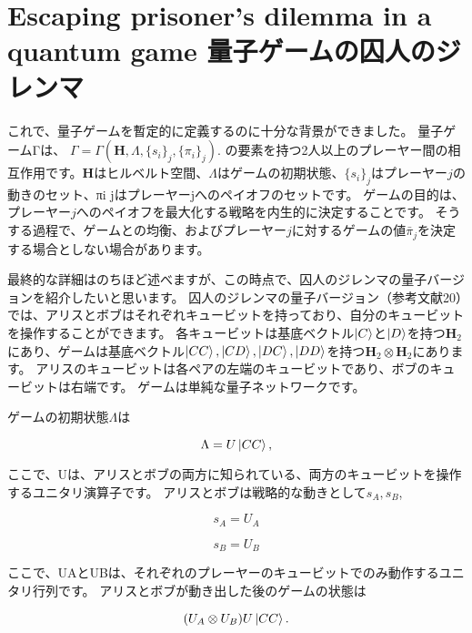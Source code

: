 \section{Escaping prisoner’s dilemma in a quantum game 量子ゲームの囚人のジレンマ}

これで、量子ゲームを暫定的に定義するのに十分な背景ができました。 量子ゲームΓは、
$\Gamma = \Gamma ( \mathbf{H}, \Lambda,\{ s_i \}_j, \{  \pi_i \}_j ).$
の要素を持つ2人以上のプレーヤー間の相互作用です。$\mathbf{H}$はヒルベルト空間、$\Lambda$はゲームの初期状態、$ \{s_i\}_ j$はプレーヤー$j$の動きのセット、{πi} jはプレーヤーjへのペイオフのセットです。
ゲームの目的は、プレーヤー$j$へのペイオフを最大化する戦略を内生的に決定することです。
  そうする過程で、ゲームとの均衡、およびプレーヤー$j$に対するゲームの値$\bar{\pi}_j$を決定する場合としない場合があります。

最終的な詳細はのちほど述べますが、この時点で、囚人のジレンマの量子バージョンを紹介したいと思います。
  囚人のジレンマの量子バージョン（参考文献20）では、アリスとボブはそれぞれキュービットを持っており、自分のキュービットを操作することができます。
各キュービットは基底ベクトル$\ket{C}$と$\ket{D}$を持つ$\mathbf{H}_2$にあり、ゲームは基底ベクトル$\ket{CC}, \ket{CD}, \ket{DC}, \ket{DD}$を持つ$\mathbf{H}_2 \otimes \mathbf{H}_2 $にあります。
  アリスのキュービットは各ペアの左端のキュービットであり、ボブのキュービットは右端です。 ゲームは単純な量子ネットワークです。
 
 ゲームの初期状態$\Lambda$は
 
\begin{equation}
\label{119}
\Lambda = U \ket{CC},
\end{equation}
 
 ここで、Uは、アリスとボブの両方に知られている、両方のキュービットを操作するユニタリ演算子です。
アリスとボブは戦略的な動きとして$s_A, s_B$,

\begin{equation}
\label{120}
s_A = U_A 
\end{equation}

\begin{equation}
\label{121}
s_B = U_B 
\end{equation}

ここで、UAとUBは、それぞれのプレーヤーのキュービットでのみ動作するユニタリ行列です。 アリスとボブが動き出した後のゲームの状態は

\begin{equation}
\label{122}
( U_A \otimes U_B ) U \ket{CC}.
\end{equation}

